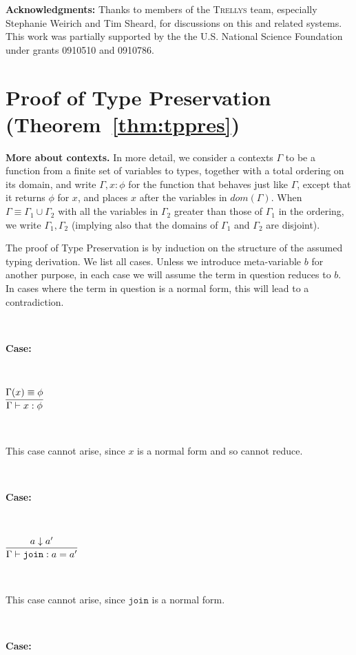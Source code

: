 \documentclass[copyright]{eptcs}
\newcommand{\join}[0]{\texttt{join}}
\begin{document}
\textbf{Acknowledgments:} Thanks to members of the \textsc{Trellys}
team, especially Stephanie Weirich and Tim Sheard, for discussions on
this and related systems.  This work was partially supported by the
the U.S. National Science Foundation under grants 0910510 and 0910786.




\ifTR
\appendix

\section{Proof of Type Preservation (Theorem~\ref{thm:tppres})}

\textbf{More about contexts.}  In more detail, we consider a contexts
$\Gamma$ to be a function from a finite set of variables to types,
together with a total ordering on its domain, and write
$\Gamma,x:\phi$ for the function that behaves just like $\Gamma$,
except that it returns $\phi$ for $x$, and places $x$ after the
variables in $\textit{dom}(\Gamma)$.  When
$\Gamma\equiv\Gamma_1\cup\Gamma_2$ with all the variables in
$\Gamma_2$ greater than those of $\Gamma_1$ in the ordering, we write
$\Gamma_1,\Gamma_2$ (implying also that the domains of $\Gamma_1$ and
$\Gamma_2$ are disjoint).

The proof of Type Preservation is by induction on the structure of the
assumed typing derivation.  We list all cases.  Unless we introduce
meta-variable $b$ for another purpose, in each case we will assume the
term in question reduces to $b$.  In cases where the term in question
is a normal form, this will lead to a contradiction.

\ 

\noindent \textbf{Case:}

\

$\infer{\Gamma\vdash x:\phi}{\Gamma(x) \equiv \phi}$

\ 

\noindent This case cannot arise, since $x$ is a normal form and so
cannot reduce.

\ 

\noindent \textbf{Case:}

\

$\infer{\Gamma\vdash \join : a = a'}{a \downarrow a'}$

\ 

\noindent This case cannot arise, since $\join$ is a normal form.

\ 

\noindent \textbf{Case:}
\end{document}
